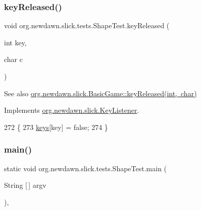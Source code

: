 \subsubsection{\texorpdfstring{key\+Released()}{keyReleased()}}
{\footnotesize\ttfamily void org.\+newdawn.\+slick.\+tests.\+Shape\+Test.\+key\+Released (\begin{DoxyParamCaption}\item[{int}]{key,  }\item[{char}]{c }\end{DoxyParamCaption})\hspace{0.3cm}{\ttfamily [inline]}}

\begin{DoxySeeAlso}{See also}
\mbox{\hyperlink{classorg_1_1newdawn_1_1slick_1_1_basic_game_ae8ce436f93206f0b251a0fbf2a345849}{org.\+newdawn.\+slick.\+Basic\+Game\+::key\+Released(int, char)}} 
\end{DoxySeeAlso}


Implements \mbox{\hyperlink{interfaceorg_1_1newdawn_1_1slick_1_1_key_listener_a474673b59bc77266bcef3c261c26ee2b}{org.\+newdawn.\+slick.\+Key\+Listener}}.


\begin{DoxyCode}
272                                              \{
273         \mbox{\hyperlink{classorg_1_1newdawn_1_1slick_1_1tests_1_1_shape_test_abd8d1f480191272d0dc2ad5c9afe14fc}{keys}}[key] = \textcolor{keyword}{false};
274     \}
\end{DoxyCode}
\mbox{\label{classorg_1_1newdawn_1_1slick_1_1tests_1_1_shape_test_a4dc07a1d24ad03f8f2927698b7334699}} 
\subsubsection{\texorpdfstring{main()}{main()}}
{\footnotesize\ttfamily static void org.\+newdawn.\+slick.\+tests.\+Shape\+Test.\+main (\begin{DoxyParamCaption}\item[{String \mbox{[}$\,$\mbox{]}}]{argv }\end{DoxyParamCaption})\hspace{0.3cm}{\ttfamily [inline]}, {\ttfamily [static]}}

